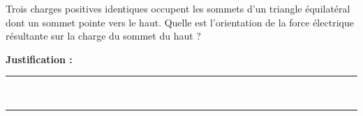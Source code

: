 Trois charges positives identiques occupent les sommets d'un triangle équilatéral dont un sommet pointe vers le haut. Quelle est l'orientation de la force électrique résultante sur la charge du sommet du haut ?

\choices

\noindent\textbf{Justification :} \hrulefill \\[2.5ex]
\rule{\linewidth}{0.4pt} \\[2.5ex]
\rule{\linewidth}{0.4pt}
\vfill
